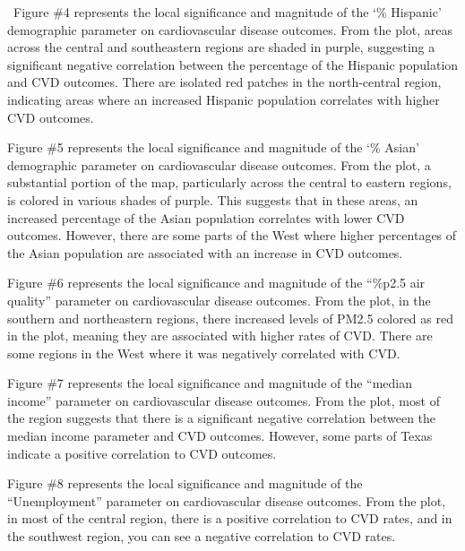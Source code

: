 \documentclass[
]{article}
\begin{document}
~Figure \#4 represents the local significance and magnitude of the `\%
Hispanic' demographic parameter on cardiovascular disease outcomes. From
the plot, areas across the central and southeastern regions are shaded
in purple, suggesting a significant negative correlation between the
percentage of the Hispanic population and CVD outcomes. There are
isolated red patches in the north-central region, indicating areas where
an increased Hispanic population correlates with higher CVD outcomes.~

Figure \#5 represents the local significance and magnitude of the `\%
Asian' demographic parameter on cardiovascular disease outcomes. From
the plot, a substantial portion of the map, particularly across the
central to eastern regions, is colored in various shades of purple. This
suggests that in these areas, an increased percentage of the Asian
population correlates with lower CVD outcomes. However, there are some
parts of the West where higher percentages of the Asian population are
associated with an increase in CVD outcomes.~

Figure \#6 represents the local significance and magnitude of the
``\%p2.5 air quality'' parameter on cardiovascular disease outcomes.
From the plot, in the southern and northeastern regions, there increased
levels of PM2.5 colored as red in the plot, meaning they are associated
with higher rates of CVD. There are some regions in the West where it
was negatively correlated with CVD.

Figure \#7 represents the local significance and magnitude of the
``median income'' parameter on cardiovascular disease outcomes. From the
plot, most of the region suggests that there is a significant negative
correlation between the median income parameter and CVD outcomes.
However, some parts of Texas indicate a positive correlation to CVD
outcomes.~

Figure \#8 represents the local significance and magnitude of the
``Unemployment'' parameter on cardiovascular disease outcomes. From the
plot, in most of the central region, there is a positive correlation to
CVD rates, and in the southwest region, you can see a negative
correlation to CVD rates.
\end{document}
